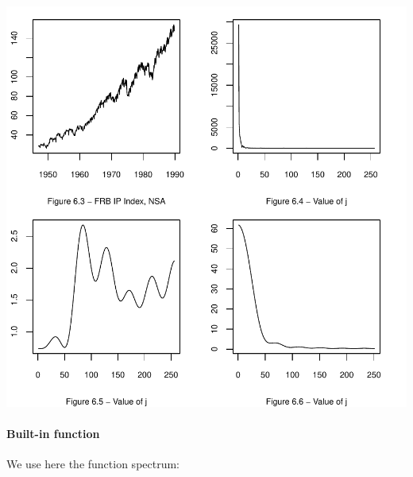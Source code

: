 \documentclass[a4paper]{article}
\begin{document}
\begin{center}
\includegraphics{Companion-031}

\paragraph{Built-in function\label{par:Chap6Auto}}
We use here the function spectrum:


\end{center}
\end{document}
